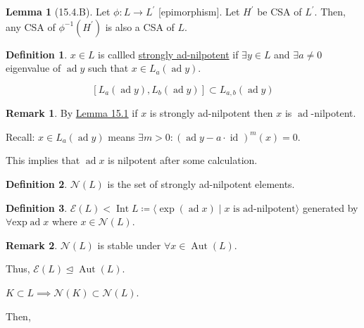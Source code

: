 \documentclass{article}
\theoremstyle{definition}
\newtheorem*{definition}{Definition}
\newtheorem{lemma}[theorem]{Lemma}
\newtheorem*{remark}{Remark}
\begin{document}
    \begin{lemma}
        [15.4.B] Let \(\phi: L \to L^{\prime}\) [epimorphism]. Let \(H^{\prime}\) be CSA of \(L^{\prime}\). Then, any CSA of \(\phi ^{-1} (H^{\prime})\) is also a CSA of \(L\).
    \end{lemma}

    \begin{definition}
        \(x\in L\) is callled \underline{strongly ad-nilpotent} if \(\exists y\in L\) and \(\exists a\neq 0\) eigenvalue of \(\operatorname{ad} y\) such that \(x\in L_a(\operatorname{ad} y)\).

        \[
            [L_a(\operatorname{ad} y), L_b(\operatorname{ad} y)] \subset L_{a,b}(\operatorname{ad} y)
        \]
    \end{definition}

    \begin{remark}
        By \underline{Lemma 15.1} if \(x\) is strongly ad-nilpotent then \(x\) is \(\operatorname{ad}\)-nilpotent.  

        Recall: \(x\in L_a(\operatorname{ad} y)\) means \(\exists m > 0 : (\operatorname{ad} y - a \cdot \operatorname{id}_{})^m (x) = 0\).
    
        This implies that \(\operatorname{ad} x\) is nilpotent after some calculation.
    \end{remark}

    \begin{definition}
        \(\mathcal{N} (L)\) is the set of strongly ad-nilpotent elements. 
    \end{definition}

    \begin{definition}
        \(\mathscr{E} (L) < \operatorname{Int} L \coloneqq \langle \exp (\operatorname{ad} x) \mid x \text{ is ad-nilpotent}  \rangle \) generated by \(\forall \text{exp} \operatorname{ad} x\) where \(x\in \mathcal{N} (L)\).
    \end{definition}

    \begin{remark}
        \(\mathcal{N}(L)\) is stable under \(\forall x \in \operatorname{Aut}(L)\).
        
        Thus, \(\mathscr{E}(L) \trianglelefteq \operatorname{Aut}(L)\).

        \(K \subset L \implies \mathcal{N}(K) \subset \mathcal{N}(L)\).

        Then,
    \end{remark}
\end{document}
